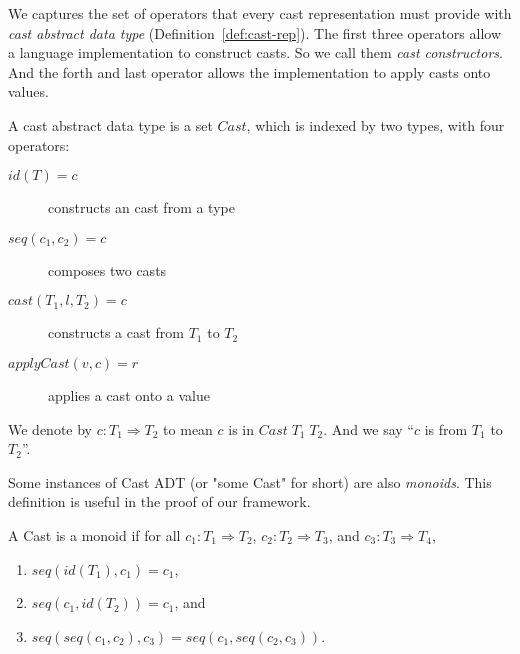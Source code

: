 \documentclass[acmsmall,review,anonymous]{acmart}\settopmatter{printfolios=true,printccs=false,printacmref=false}
\newcommand{\judgeTypeFT}[3]{#1 : #2 \Longrightarrow #3} %
\newcommand{\lazyD}{Lazy\;D}
\begin{document}

We captures the set of operators that every cast representation must provide 
with \emph{cast abstract data type} (Definition~\ref{def:cast-rep}). 
The first three operators allow a language implementation to construct casts. 
So we call them \textit{cast constructors}. And the forth and last operator 
allows the implementation to apply casts onto values. 

\begin{definition}
	\label{def:cast-rep}
	A cast abstract data type is a set $ Cast $, which is indexed by two types, 
	with four operators:
	\begin{description}
		\item[$ id(T) = c $] constructs an cast from a type
		\item[$ seq(c_1,c_2)=c $] composes two casts
		\item[$ cast(T_1,l,T_2)=c $] constructs a cast from $ T_1 $ to $ T_2 $
		\item[$ applyCast(v,c)=r $] applies a cast onto a value
	\end{description}
	We denote by $ c : T_1 \Longrightarrow T_2 $ to mean $ c $ is in $ Cast \; 
	T_1 \; T_2 $. And we say ``$ c $ is from $ T_1 $ to $ T_2 $''.
\end{definition}

Some instances of Cast ADT (or "some Cast" for short) are also 
\textit{monoids}. This definition is useful in the proof of 
our framework.

\begin{definition}[Monoid]
	A Cast is a monoid if 
	for all
	$c_1 : T_1 \Longrightarrow T_2$,
	$c_2 : T_2 \Longrightarrow T_3$, and
	$c_3 : T_3 \Longrightarrow T_4$,
	\begin{enumerate}
		\item $seq(id(T_1),c_1) = c_1$,
		\item $seq(c_1,id(T_2)) = c_1$, and
		\item $seq(seq(c_1, c_2), c_3) = seq(c_1, seq(c_2, c_3))$.
	\end{enumerate}
\end{definition}
\end{document}
